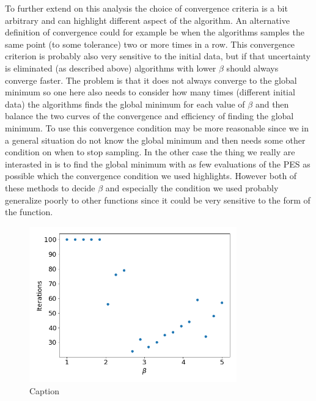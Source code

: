 \documentclass[11pt,a4paper]{article}
\begin{document}
To further extend on this analysis the choice of convergence criteria is a bit arbitrary and can highlight different aspect of the algorithm. An alternative definition of convergence could for example be when the algorithms samples the same point (to some tolerance) two or more times in a row. This convergence criterion is probably also very sensitive to the initial data, but if that uncertainty is eliminated (as described above) algorithms with lower $\beta$ should always converge faster. The problem is that it does not always converge to the global minimum so one here also needs to consider how many times (different initial data) the algorithms finds the global minimum for each value of $\beta$ and then balance the two curves of the convergence and efficiency of finding the global minimum. To use this convergence condition may be more reasonable since we in a general situation do not know the global minimum and then needs some other condition on when to stop sampling. In the other case the thing we really are interasted in is to find the global minimum with as few evaluations of the PES as possible which the convergence condition we used highlights. However both of these methods to decide $\beta$ and especially the condition we used probably  generalize poorly to other functions since it could be very sensitive to the form of the function.

\begin{figure}[H]
    \centering
    \includegraphics[width = 0.8\textwidth]{figures/task3_iter.png}
    \caption{Caption}
    \label{fig:task3_iter}
\end{figure}
\end{document}
